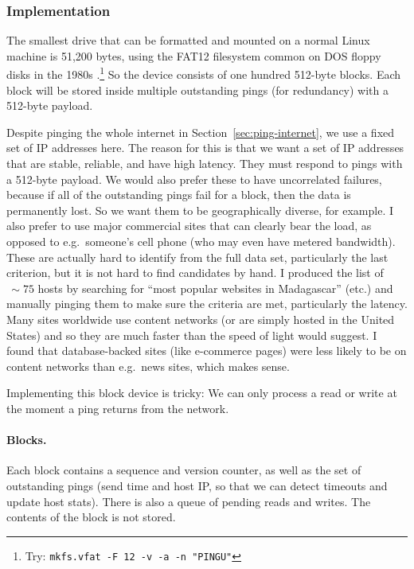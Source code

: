\documentclass[twocolumn]{article}
\begin{document}
\subsubsection{Implementation}

The smallest drive that can be formatted and mounted on a normal Linux
machine is 51,200 bytes, using the FAT12 filesystem common on DOS
floppy disks in the 1980s \cite{wikipediafat12}.\!\footnote{ Try:
  \verb+mkfs.vfat -F 12 -v -a -n "PINGU"+ } So the device consists of
one hundred 512-byte blocks. Each block will be stored inside multiple
outstanding pings (for redundancy) with a 512-byte payload.

Despite pinging the whole internet in Section~\ref{sec:ping-internet},
we use a fixed set of IP addresses here. The reason for this is that
we want a set of IP addresses that are stable, reliable, and have high
latency. They must respond to pings with a 512-byte payload. We would
also prefer these to have uncorrelated failures, because if all of the
outstanding pings fail for a block, then the data is permanently lost.
So we want them to be geographically diverse, for example. I also
prefer to use major commercial sites that can clearly bear the load,
as opposed to e.g.~someone's cell phone (who may even have metered
bandwidth). These are actually hard to identify from the full data
set, particularly the last criterion, but it is not hard to find
candidates by hand. I produced the list of $\,\sim\!75$ hosts by searching for
``most popular websites in Madagascar'' (etc.) and manually pinging
them to make sure the criteria are met, particularly the latency. Many
sites worldwide use content networks (or are simply hosted in the
United States) and so they are much faster than the speed of light
would suggest. I found that database-backed sites (like e-commerce
pages) were less likely to be on content networks than e.g.~news
sites, which makes sense.


Implementing this block device is tricky: We can only process a read
or write at the moment a ping returns from the network.

\paragraph{Blocks.} Each block contains a sequence and version counter,
as well as the set of outstanding pings (send time and host IP, so that
we can detect timeouts and update host stats). There is also a queue
of pending reads and writes. The contents of the block is not stored.
\end{document}
